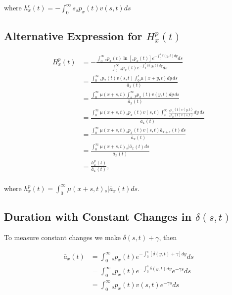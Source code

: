 \documentclass[12pt]{article}
\begin{document}
where ${h}^{c}_x(t)=-\int_0^\infty s {}_sp_x(t) {v}(s,t)ds$



\subsection{Alternative Expression for ${H}^{p}_{x}(t)$}\label{sec:EntropyAlt}

\begin{equation} \label{eq:EntropyAnnuityA1}
\begin{split}
{H}^{p}_{x}(t) &= -\frac{ \int_{0}^{\infty}{}_sp_x(t)\ln[{}_sp_x(t)] e^{-\int_{0}^{s}\delta(y,t)dy} ds}{\int_0^\infty {}_sp_x(t) e^{-\int_{0}^{s}\delta(y,t)dy} ds}\\
&= \frac{\int_0^\infty {}_sp_x(t) {v}(s,t) \int_0^s \mu(x+y,t) dy\,ds}{\bar{a}_x(t)}\\
&= \frac{\int_0^\infty  \mu(x+s,t) \int_s^\infty {}_yp_x(t) {v}(y,t)  dy\,ds}{\bar{a}_x(t)}\\
&= \frac{\int_0^\infty  \mu(x+s,t)  {}_sp_x(t) {v}(s,t) \int_s^\infty \frac{ {}_yp_x(t) {v}(y,t)}{ {}_sp_x(t) {v}(s,t)}  dy\,ds}{\bar{a}_x(t)}\\
&=  \frac{\int_0^\infty \mu(x+s,t)   {}_sp_x(t) {v}(s,t) \bar{a}_{x+s}(t) ds}{\bar{a}_x(t)} \\
&=  \frac{\int_0^\infty \mu(x+s,t)  {}_s|\bar{a}_x(t) ds}{\bar{a}_x(t)} \\
&=  \frac{{h}^{p}_{x}(t)}{\bar{a}_x(t)}, \\
\end{split}
\end{equation}

where ${h}^{p}_{x}(t)=\int_0^\infty \mu(x+s,t)   {}_s|\bar{a}_x(t) ds$.



\subsection{Duration with Constant Changes in $\delta(s,t)$}\label{sec:DurConst}

To measure constant changes we make $\delta(s,t)+\gamma$, then

\begin{equation}\label{eq:DurationConst11}
\begin{split}
\bar{a}_{x}(t) &= \int_0^\infty {}_sp_x(t) e^{- \int_{0}^{s} [\delta(y,t)+\gamma]dy}ds \\
&= \int_0^\infty {}_sp_x(t) e^{- \int_{0}^{s}\delta(y,t)dy}e^{-\gamma s}ds \\
&= \int_0^\infty {}_sp_x(t) {v}(s,t)e^{-\gamma s}ds
\end{split}
\end{equation}
\end{document}
